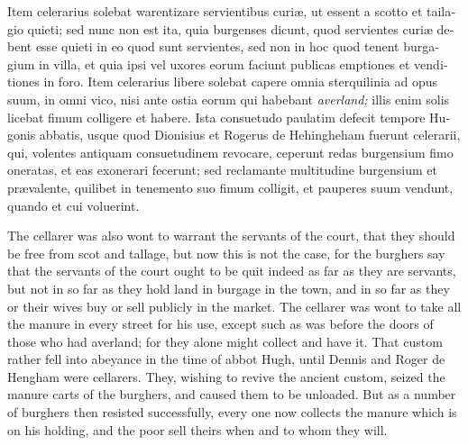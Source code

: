 \documentclass[10pt]{book}
\begin{document}
\begin{paracol}{2}
\switchcolumn*

\begin{otherlanguage}{latin}
Item celerarius solebat warentizare servientibus curi\ae{}, ut essent a scotto et tailagio quieti; sed nunc non est ita, quia burgenses dicunt, quod servientes curi\ae{} debent esse quieti in eo quod sunt servientes, sed non in hoc quod tenent burgagium in villa, et quia ipsi vel uxores eorum faciunt publicas emptiones et venditiones in foro. Item celerarius libere solebat capere omnia sterquilinia ad opus suum, in omni vico, nisi ante ostia eorum qui habebant \emph{averland;} illis enim solis licebat fimum colligere et habere. Ista consuetudo paulatim defecit tempore Hugonis abbatis, usque quod Dionisius et Rogerus de Hehingheham fuerunt celerarii, qui, volentes antiquam consuetudinem revocare, ceperunt redas burgensium fimo oneratas, et eas exonerari fecerunt; sed reclamante multitudine burgensium et pr\ae{}valente, quilibet in tenemento suo fimum colligit, et pauperes suum vendunt, quando et cui voluerint.
\end{otherlanguage}

\switchcolumn

The cellarer was also wont to warrant the servants of the court, that they should be free from scot and tallage, but now this is not the case, for the burghers say that the servants of the court ought to be quit indeed as far as they are servants, but not in so far as they hold land in burgage in the town, and in so far as they or their wives buy or sell publicly in the market. The cellarer was wont to take all the manure in every street for his use, except such as was before the doors of those who had averland; for they alone might collect and have it. That custom rather fell into abeyance in the time of abbot Hugh, until Dennis and Roger de Hengham were cellarers. They, wishing to revive the ancient custom, seized the manure carts of the burghers, and caused them to be unloaded. But as a number of burghers then resisted successfully, every one now collects the manure which is on his holding, and the poor sell theirs when and to whom they will.

\switchcolumn*


\end{paracol}
\end{document}
